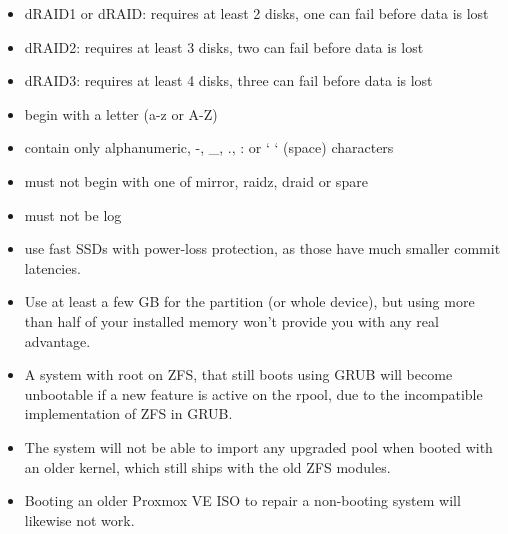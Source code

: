 \begin{itemize}[leftmargin=2cm]

	\item dRAID1 or dRAID: requires at least 2 disks, one can fail before data is lost

	\item dRAID2: requires at least 3 disks, two can fail before data is lost

	\item dRAID3: requires at least 4 disks, three can fail before data is lost

\end{itemize}

\begin{itemize}[leftmargin=2cm]

	\item begin with a letter (a-z or A-Z)

	\item contain only alphanumeric, -, _, ., : or ` ` (space) characters

	\item must not begin with one of mirror, raidz, draid or spare

	\item must not be log

\end{itemize}

\begin{itemize}[leftmargin=2cm]

	\item use fast SSDs with power-loss protection, as those have much smaller commit latencies.

	\item Use at least a few GB for the partition (or whole device), but using more than half of your installed memory won’t provide you with any real advantage.

\end{itemize}

\begin{itemize}[leftmargin=2cm]

	\item A system with root on ZFS, that still boots using GRUB will become unbootable if a new feature is active on the rpool, due to the incompatible implementation of ZFS in GRUB.

	\item The system will not be able to import any upgraded pool when booted with an older kernel, which still ships with the old ZFS modules.

	\item Booting an older Proxmox VE ISO to repair a non-booting system will likewise not work.

\end{itemize}

